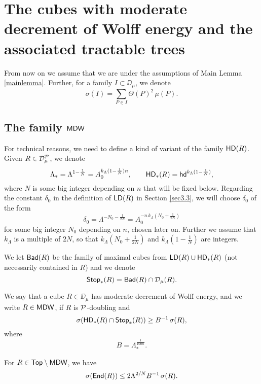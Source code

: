 

\section{The cubes with moderate decrement of Wolff energy and the associated tractable trees} \label{sec4}

From now on we assume that we are under the assumptions of Main Lemma \ref{mainlemma}. Further, 
for a family $I\subset\DD_\mu$, we denote
$$\sigma(I) = \sum_{P\in I}\Theta(P)^2\,\mu(P).$$

\subsection{The family \texorpdfstring{${\mathsf{MDW}}$}{MDW}}\label{secMDW}

For technical reasons, we need to define a kind of variant of the family ${\mathsf{HD}}(R)$. Given $R\in{\mathcal D}_\mu^{\mathcal P}$,
we denote
$$\Lambda_*= \Lambda^{1-\frac1N} = A_0^{k_\Lambda (1-\frac1N)n},\qquad
{\mathsf{HD}}_*(R) = {\mathsf{hd}}^{k_\Lambda (1-\frac1N)},$$
where $N$ is some big integer depending on $n$ that will be fixed below. Regarding the constant $\delta_0$ in the definition of ${\mathsf{LD}}(R)$ in Section \ref{sec3.3}, we will choose $\delta_0$ of the form
$$\delta_0 = \Lambda^{-N_0 - \frac1{2N}} = A_0^{-n\,k_\Lambda(N_0 + \frac1{2N})}$$
for some big integer $N_0$ depending on $n$, chosen later on.
Further we assume that $k_\Lambda$ is a multiple of $2N$, so that $k_\Lambda(N_0 + \frac1{2N})$ and $k_\Lambda (1-\frac1N)$ are integers.

We let ${\mathsf{Bad}}(R)$ be the family of maximal cubes from ${\mathsf{LD}}(R)\cup{\mathsf{HD}}_*(R)$ (not necessarily  contained 
in $R$) and we denote
$${\mathsf {Stop}}_*(R)= {\mathsf{Bad}}(R)\cap{\mathcal D}_\mu(R).$$


We say that a cube $R\in\DD_{\mu}$ has moderate decrement of Wolff energy, and we write
$R\in{\mathsf{MDW}}$, if $R$ is ${\mathcal P}$-doubling and
\begin{equation}\label{eq:MDWdef}
\sigma({\mathsf{HD}}_*(R)\cap{\mathsf {Stop}}_*(R))\geq B^{-1}\,\sigma(R),
\end{equation}
where
$$B= \Lambda_*^{\frac1{100n}}.$$  


\vv
\begin{lemma}
For $R\in{\mathsf {Top}}\setminus {\mathsf{MDW}}$, we have
\begin{equation}\label{eqmdw81}
\sigma({\mathsf{End}}(R))\leq 2\Lambda^{2/N}B^{-1}\,\sigma(R).
\end{equation}
\end{lemma}

